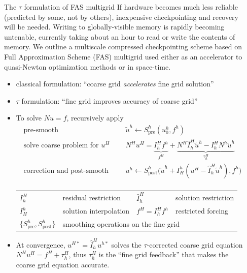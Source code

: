 \documentclass[final,t]{beamer}
\begin{document}
\begin{frame}{}
\begin{columns}
\begin{column}{0.31\textwidth}
    \end{column}
    \begin{column}{0.31\textwidth}
      \begin{block}{The $\tau$ formulation of FAS multigrid}
        If hardware becomes much less reliable (predicted by some, not by others), inexpensive checkpointing and recovery will be needed.
        Writing to globally-visible memory is rapidly becoming untenable, currently taking about an hour to read or write the contents of memory.
        We outline a multiscale compressed checkpointing scheme based on Full Approximation Scheme (FAS) multigrid used either as an accelerator to quasi-Newton optimization methods or in space-time.
        \begin{itemize}
        \item classical formulation: ``coarse grid \emph{accelerates} fine grid solution''
        \item $\tau$ formulation: ``fine grid improves accuracy of coarse grid''
        \item To solve $N u = f$, recursively apply
          \begin{equation*}
            \begin{split}
              \text{pre-smooth} \:\: & \quad \tilde u^h \gets S^h_{\text{pre}}(u^h_0, f^h) \\
              \text{solve coarse problem for $u^H$} \:\: & \quad N^H u^H = \underbrace{I_h^H f^h}_{f^H} + \underbrace{N^H \hat I_h^H \tilde u^h - I_h^H N^h \tilde u^h}_{\tau_h^H} \\
              \text{correction and post-smooth} \:\: & \quad u^h \gets S^h_{\text{post}} \Big( \tilde u^h + I_H^h (u^H - \hat I_h^H \tilde u^h), f^h \Big) \\
            \end{split}
          \end{equation*}
          \begin{tabular}{llll}
            \toprule
            $I_h^H$ & residual restriction & $\hat I_h^H$ & solution restriction \\
            $I_H^h$ & solution interpolation & $f^H = I_h^H f^h$ & restricted forcing \\
            $\{S^h_{\text{pre}},S^h_{\text{post}}\}$ & \multicolumn{3}{l}{smoothing operations on the fine grid} \\
            \bottomrule
          \end{tabular}
        \item At convergence, $u^{H*} = \hat I_h^H u^{h*}$ solves the $\tau$-corrected coarse grid equation
            $N^H u^H = f^H + \tau_h^H$,
          thus $\tau_h^H$ is the ``fine grid feedback'' that makes the coarse grid equation accurate.
        \end{itemize}
      \end{block}


\end{column}
\end{columns}
\end{frame}
\end{document}

